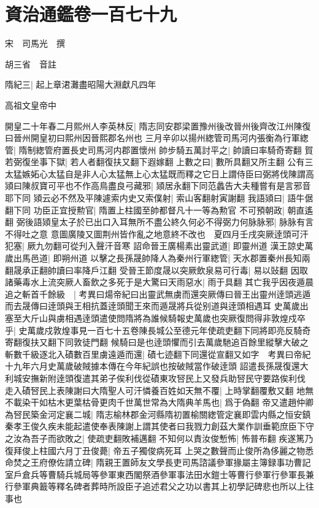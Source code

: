 \section{資治通鑑卷一百七十九}
宋　司馬光　撰

胡三省　音註

隋紀三|{
	起上章涒灘盡昭陽大淵獻凡四年}


高祖文皇帝中

開皇二十年春二月熙州人李英林反|{
	隋志同安郡梁置豫州後改晉州後齊改江州陳復曰晉州開皇初曰熙州因晉熙郡名州也}
三月辛卯以揚州緫管司馬河内張衡為行軍緫管|{
	隋制緫管府置長史司馬河内郡置懷州}
帥步騎五萬討平之|{
	帥讀曰率騎奇寄翻}
賀若弼復坐事下獄|{
	若人者翻復扶又翻下遐嫁翻}
上數之曰|{
	數所具翻又所主翻}
公有三太猛嫉妬心太猛自是非人心太猛無上心太猛既而釋之它日上謂侍臣曰弼將伐陳謂高熲曰陳叔寶可平也不作高鳥盡良弓藏邪|{
	熲居永翻下同范蠡告大夫種嘗有是言邪音耶下同}
熲云必不然及平陳遽索内史又索僕射|{
	索山客翻射寅謝翻}
我語熲曰|{
	語牛倨翻下同}
功臣正宜授勲官|{
	隋置上柱國至帥都督凡十一等為勲官}
不可預朝政|{
	朝直遙翻}
弼後語熲皇太子於已出口入耳無所不盡公終久何必不得弼力何脉脉邪|{
	脉脉有言不得吐之意}
意圖廣陵又圖荆州皆作亂之地意終不改也　夏四月壬戌突厥逹頭可汗犯塞|{
	厥九勿翻可從刋入聲汗音寒}
詔命晉王廣楊素出靈武道|{
	即靈州道}
漢王諒史萬歲出馬邑道|{
	即朔州道}
以擊之長孫晟帥降人為秦州行軍緫管|{
	天水郡置秦州長知兩翻晟承正翻帥讀曰率降戶江翻}
受晉王節度晟以突厥飲泉易可行毒|{
	易以䜴翻}
因取諸藥毒水上流突厥人畜飲之多死于是大驚曰天雨惡水|{
	雨于具翻}
其亡我乎因夜遁晨追之斬首千餘級　|{
	考異曰煬帝紀曰出靈武無虜而還突厥傳曰晉王出靈州逹頭逃遁而去晟傳曰逹頭與王相抗蓋逹頭聞王來而遁晟將兵從别道與逹頭相遇耳}
史萬歲出塞至大斤山與虜相遇逹頭遣使問隋將為誰候騎報史萬歲也突厥復問得非敦煌戍卒乎|{
	史萬歲戍敦煌事見一百七十五卷陳長城公至德元年使疏吏翻下同將即亮反騎奇寄翻復扶又翻下同敦徒門翻}
候騎曰是也逹頭懼而引去萬歲馳追百餘里縱擊大破之斬數千級逐北入磧數百里虜遠遁而還|{
	磧七迹翻下同還從宣翻又如字　考異曰帝紀十九年六月史萬歲破賊據本傳在今年紀誤也按破賊當作破逹頭}
詔遣長孫晟復還大利城安撫新附逹頭復遣其弟子俟利伐從磧東攻唘民上又發兵助唘民守要路俟利伐走入磧唘民上表陳謝曰大隋聖人可汗憐養百姓如天無不覆|{
	上時掌翻覆敷又翻}
地無不載染干如枯木更葉枯骨更肉千世萬世常為大隋典羊馬也|{
	爲于偽翻}
帝又遣趙仲卿為唘民築金河定襄二城|{
	隋志榆林郡金河縣隋初置榆關緫管定襄即雲内縣之恒安鎮}
秦孝王俊久疾未能起遣使奉表陳謝上謂其使者曰我戮力創茲大業作訓垂範庶臣下守之汝為吾子而欲敗之|{
	使疏吏翻敗補邁翻}
不知何以責汝俊慙怖|{
	怖普布翻}
疾遂篤乃復拜俊上柱國六月丁丑俊薨|{
	帝五子獨俊病死耳}
上哭之數聲而止俊所為侈麗之物悉命焚之王府僚佐請立碑|{
	隋親王置師友文學長吏司馬諮議參軍掾屬主簿録事功曹記室戶倉兵等曹騎兵城局等參軍東西閣祭酒參軍事法田水鎧士等曹行參軍行參軍長兼行參軍典籖等釋名碑者葬時所設臣子追述君父之功以書其上初學記碑悲也所以上往事也}
